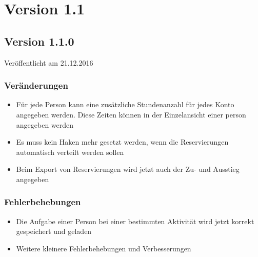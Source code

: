 \section{Version 1.1}\label{versionshistorie:1:1}
\subsection{Version 1.1.0}
\label{version:1:1:0}
Veröffentlicht am 21.12.2016
\subsubsection{Veränderungen}
\begin{itemize}
  \item
  Für jede Person kann eine zusätzliche Stundenanzahl für jedes Konto angegeben werden. Diese Zeiten können in der Einzelansicht einer person angegeben werden
  \item
  Es muss kein Haken mehr gesetzt werden, wenn die Reservierungen automatisch verteilt werden sollen
  \item
  Beim Export von Reservierungen wird jetzt auch der Zu- und Ausstieg angegeben
\end{itemize}

\subsubsection{Fehlerbehebungen}
\begin{itemize}
  \item
  Die Aufgabe einer Person bei einer bestimmten Aktivität wird jetzt korrekt gespeichert und geladen
  \item
  Weitere kleinere Fehlerbehebungen und Verbesserungen
\end{itemize}
